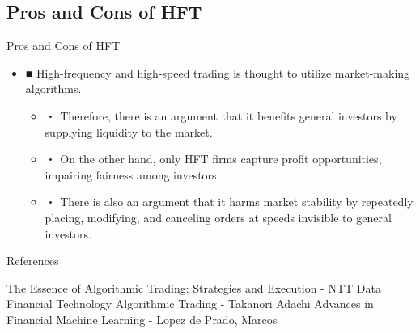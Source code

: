 \documentclass[dvipdfmx, autodetect-engine, aspectratio=169, 10.5pt]{beamer}
\begin{document}
\subsection{Pros and Cons of HFT}
\begin{frame}{Pros and Cons of HFT}
	\begin{itemize}
		\item ■ High-frequency and high-speed trading is thought to utilize market-making algorithms.
		      \begin{itemize}
			      \item ・ Therefore, there is an argument that it benefits general investors by supplying liquidity to the market.
			      \item ・ On the other hand, only HFT firms capture profit opportunities, impairing fairness among investors.
			      \item ・ There is also an argument that it harms market stability by repeatedly placing, modifying, and canceling orders at speeds invisible to general investors.
		      \end{itemize}
	\end{itemize}
\end{frame}

\begin{frame}[allowframebreaks]{References}
	\begin{thebibliography}{9}
		The Essence of Algorithmic Trading: Strategies and Execution - NTT Data Financial Technology
		Algorithmic Trading - Takanori Adachi
		Advances in Financial Machine Learning - Lopez de Prado, Marcos
	\end{thebibliography}
\end{frame}
\end{document}
